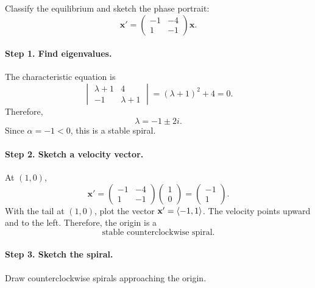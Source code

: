 \documentclass[11pt,letterpaper]{article}
\begin{document}
\begin{example}[6]{
Classify the equilibrium and sketch the phase portrait:
\[
\mathbf{x}'=
\begin{pmatrix}
-1&-4\\
1&-1
\end{pmatrix}\mathbf{x}.
\]
}

\paragraph{Step 1. Find eigenvalues.}
The characteristic equation is
\[
\begin{vmatrix}
\lambda+1&4\\
-1&\lambda+1
\end{vmatrix}
=(\lambda+1)^2+4=0.
\]
Therefore,
\[
\lambda=-1\pm2i.
\]
Since $\alpha=-1< 0$, this is a stable spiral.

\paragraph{Step 2. Sketch a velocity vector.}
At $(1,0)$,
\[
\mathbf{x}'=
\begin{pmatrix}
-1&-4\\
1&-1
\end{pmatrix}
\begin{pmatrix}1\\0\end{pmatrix}
=
\begin{pmatrix}-1\\1\end{pmatrix}.
\]
With the tail at $(1,0)$, plot the vector $\textbf{x}'=\left\langle -1,1\right\rangle$.
The velocity points upward and to the left.
Therefore, the origin is a
\[
\boxed{\text{stable counterclockwise spiral}.}
\]

\paragraph{Step 3. Sketch the spiral.}
Draw counterclockwise spirals approaching the origin.

\begin{center}
\end{center}
\end{example}
\end{document}
